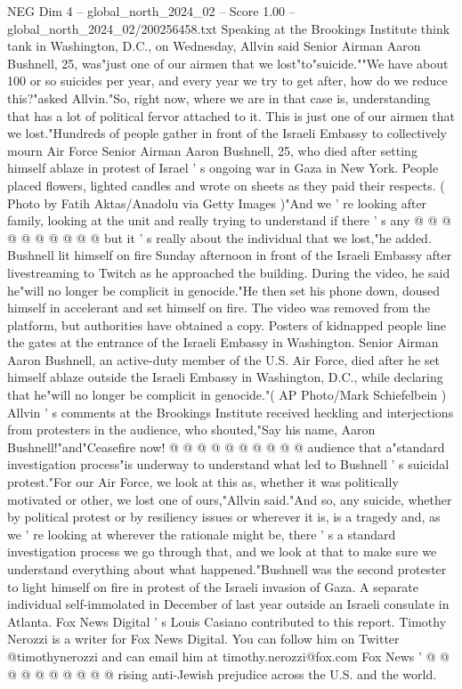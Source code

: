 \begin{textsample}{NEG Dim 4 – global\_north\_2024\_02 – Score 1.00 – global\_north\_2024\_02/200256458.txt}  \label{ex:f4_neg_277}
Speaking at the Brookings Institute think tank in Washington, D.C., on Wednesday, Allvin said Senior Airman Aaron Bushnell, 25, was"just one of our airmen that we lost"to"suicide.""We have about 100 or so suicides per year, and every year we try to get after, how do we reduce this?"asked Allvin."So, right now, where we are in that case is, understanding that has a lot of political fervor attached to it.
This is just one of our airmen that we lost."Hundreds of people gather in front of the Israeli Embassy to collectively mourn Air Force Senior Airman Aaron Bushnell, 25, who died after setting himself ablaze in protest of Israel ' s ongoing war in Gaza in New York.
People placed flowers, lighted candles and wrote on sheets as they paid their respects. ( Photo by Fatih Aktas/Anadolu via Getty Images )"And we ' re looking after family, looking at the unit and really trying to understand if there ' s any @ @ @ @ @ @ @ @ @ @ but it ' s really about the individual that we lost,"he added.
Bushnell lit himself on fire Sunday afternoon in front of the Israeli Embassy after livestreaming to Twitch as he approached the building.
During the video, he said he"will no longer be complicit in genocide."He then set his phone down, doused himself in accelerant and set himself on fire.
The video was removed from the platform, but authorities have obtained a copy.
Posters of kidnapped people line the gates at the entrance of the Israeli Embassy in Washington.
Senior Airman Aaron Bushnell, an active-duty member of the U.S.
Air Force, died after he set himself ablaze outside the Israeli Embassy in Washington, D.C., while declaring that he"will no longer be complicit in genocide."( AP Photo/Mark Schiefelbein ) Allvin ' s comments at the Brookings Institute received heckling and interjections from protesters in the audience, who shouted,"Say his name, Aaron Bushnell!"and"Ceasefire now! @ @ @ @ @ @ @ @ @ @ audience that a"standard investigation process"is underway to understand what led to Bushnell ' s suicidal protest."For our Air Force, we look at this as, whether it was politically motivated or other, we lost one of ours,"Allvin said."And so, any suicide, whether by political protest or by resiliency issues or wherever it is, is a tragedy and, as we ' re looking at wherever the rationale might be, there ' s a standard investigation process we go through that, and we look at that to make sure we understand everything about what happened."Bushnell was the second protester to light himself on fire in protest of the Israeli invasion of Gaza.
A separate individual self-immolated in December of last year outside an Israeli consulate in Atlanta.
Fox News Digital ' s Louis Casiano contributed to this report.
Timothy Nerozzi is a writer for Fox News Digital.
You can follow him on Twitter @timothynerozzi and can email him at timothy.nerozzi@fox.com Fox News ' @ @ @ @ @ @ @ @ @ @ rising anti-Jewish prejudice across the U.S. and the world.

\end{textsample}

